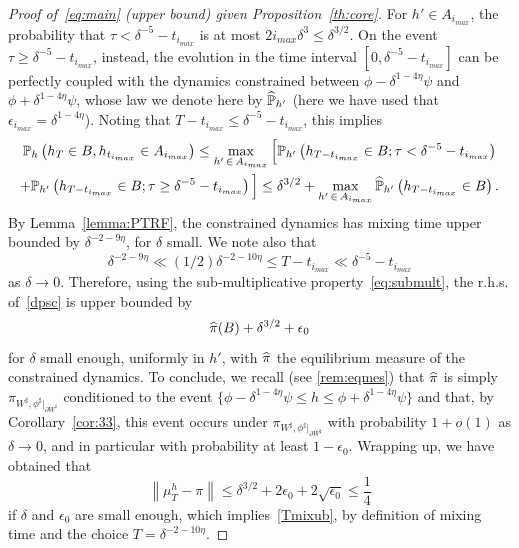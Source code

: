 \documentclass[10pt]{amsart}
\theoremstyle{definition}\newtheorem{defi}[theo]{Definition}\newtheorem{rema}[theo]{Remark}\newtheorem{exam}[theo]{Example}\newtheorem{exem}[theo]{Example}\newtheorem{nota}[theo]{Notation}
\renewcommand{\P}{\mathbb{P}}
\renewcommand{\d}{{\sharp }}
\let\oldhat\hat
\renewcommand*{\hat}[1]{\mathchoice{\widehat{#1}}{\widehat{#1}}{\oldhat{#1}}{\oldhat{#1}}}
\begin{document}
\begin{proof}[Proof of~\eqref{eq:main} (upper bound) given Proposition~\ref{th:core}]
For $h'\in A_{i_{max}}$, the probability that $\tau< \delta^{-5}-t_{i_{max}}$ is at most $2i_{max}\delta^3\leq \delta^{3/2}$. On the event $\tau\ge \delta^{-5}-t_{i_{max}}$, instead, the evolution in the time interval $[0,\delta^{-5}-t_{i_{max}}]$ can be perfectly coupled with the dynamics constrained between $\phi-\delta^{1-4\eta}\psi$ and $\phi+\delta^{1-4\eta}\psi$, whose law we denote here by $\hat\P_{h'}$ (here we have used that $\epsilon_{i_{max}}=\delta^{1-4\eta}$). Noting that $T-t_{i_{max}}\le \delta^{-5}-t_{i_{max}}$, this implies
\begin{multline}\label{dpsc}
\P_h\left(h_T\in B, h_{t_{i_{max}}} \in A_{i_{max}}\right) 
\le \max_{h'\,\in\,A_{i_{max}}}\Big[\P_{h'}\left(h_{T-t_{i_{max}}}\in B;\tau< \delta^{-5}-t_{i_{max}}\right)\\
+\P_{h'}\left(h_{T-t_{i_{max}}}\in B;\tau\geq \delta^{-5}-t_{i_{max}}\right)\Big]
\le \delta^{3/2}+ \max_{h'\,\in\,A_{i_{max}}}\hat\P_{h'}\left(h_{T-t_{i_{max}}}\in B\right).
\end{multline}
By Lemma~\ref{lemma:PTRF}, the constrained dynamics has mixing time upper bounded by $\delta^{-2-9\eta}$, for $\delta$ small. We note also that
\begin{equation}
\delta^{-2-9\eta}\ll (1/2)\delta^{-2-10\eta}\le T-t_{i_{max}}\ll \delta^{-5}-t_{i_{max}}
\end{equation}
as $\delta\to0$. Therefore, using the sub-multiplicative property~\eqref{eq:submult}, the r.h.s. of~\eqref{dpsc} is upper bounded by
\begin{equation}
\hat \pi(B)+\delta^{3/2}+\epsilon_0
\end{equation}
for $\delta$ small enough, uniformly in $h'$, with $\hat\pi$ the equilibrium measure of the constrained dynamics. To conclude, we recall (see \eqref{rem:eqmes}) that $\hat\pi$ is simply $\pi_{W^\d,\phi^\d|_{\partial W^\d}}$ conditioned to the event $\{\phi-\delta^{1-4\eta}\psi\le h\le \phi+\delta^{1-4\eta}\psi\}$ and that, by
Corollary~\ref{cor:33}, this event occurs under $\pi_{W^\d,\phi^\d|_{\partial W^\d}}$ with probability $1+o(1)$ as $\delta\to0$, and in particular with probability at least $1-\epsilon_0$. Wrapping up, we have obtained that
\begin{equation}
\left\|\mu_T^h-\pi\right\|\le \delta^{3/2}+2\epsilon_0 + 2 \sqrt{\epsilon_0} \le \frac14
\end{equation}
if $\delta$ and $ \epsilon_0$ are small enough, which implies~\eqref{Tmixub}, by definition of mixing time and the choice $T=\delta^{-2-10\eta}$.
\end{proof}
\end{document}
